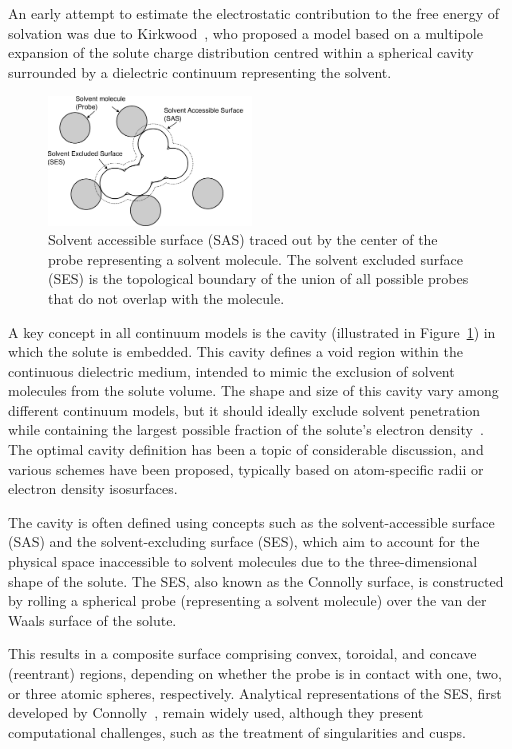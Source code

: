 An early attempt to estimate the electrostatic contribution to the free energy
of solvation was due to Kirkwood~\cite{Kirkwood1934}, who proposed a model based on a
multipole expansion of the solute charge distribution centred within a spherical
cavity surrounded by a dielectric continuum representing the solvent.

\begin{figure}
  \centering
  \includegraphics[width=0.48\textwidth]{img/cavity.pdf}
  \caption{Solvent accessible surface (SAS) traced out by
    the center of the probe representing a solvent molecule.
    The solvent excluded surface (SES) is the topological
    boundary of the union of all possible probes that do not
    overlap with the molecule.}
  \label{cavity}
\end{figure}

A key concept in all continuum models is the cavity (illustrated in
Figure~\ref{cavity}) in which the solute is embedded. This cavity defines a
void region within the continuous dielectric medium, intended to mimic the
exclusion of solvent molecules from the solute volume. The shape and size of
this cavity vary among different continuum models, but it should ideally
exclude solvent penetration while containing the largest possible fraction of
the solute's electron density~\cite{Tomasi2000}. The optimal cavity definition
has been a topic of considerable discussion, and various schemes have been
proposed, typically based on atom-specific radii or electron density
isosurfaces.

The cavity is often defined using concepts such as the solvent-accessible
surface (SAS) and the solvent-excluding surface (SES), which aim to account for 
the physical space inaccessible to solvent molecules due to the 
three-dimensional shape of the solute. The SES, also known as the Connolly
surface, is constructed by rolling a spherical probe (representing a solvent
molecule) over the van der Waals surface of the solute.

\newpage
This results in a composite surface comprising convex, toroidal, and concave
(reentrant) regions, depending on whether the probe is in contact with one,
two, or three atomic spheres, respectively. Analytical representations of the
SES, first developed by Connolly~\cite{Connolly1983}, remain widely used,
although they present computational challenges, such as the treatment of
singularities and cusps.

